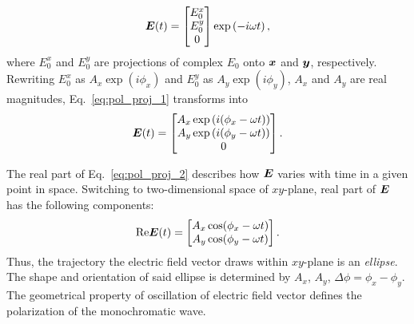 \begin{equation}
    \label{eq:pol_proj_1}
    \boldsymbol{E}(t) =  
    \begin{bmatrix}
        E_0^x \\
        E_0^y \\
        0
    \end{bmatrix} \exp\left(-i\omega t\right),
\end{equation}
where $E_0^x$ and $E_0^y$ are projections of complex $E_0$ onto $\boldsymbol{x}$ and $\boldsymbol{y}$, respectively.
Rewriting $E_0^x$ as $A_x\exp\left(i\phi_x\right)$ and $E_0^y$ as $A_y\exp\left(i\phi_y\right)$, $A_x$ and $A_y$ are real magnitudes, Eq.~\ref{eq:pol_proj_1} transforms into
\begin{equation}
    \label{eq:pol_proj_2}
    \boldsymbol{E}(t) = 
    \begin{bmatrix}
        A_x\exp\left(i(\phi_x - \omega t)\right)    \\
        A_y\exp\left(i(\phi_y - \omega t)\right)    \\
        0
    \end{bmatrix}.
\end{equation}

The real part of Eq.~\ref{eq:pol_proj_2} describes how $\boldsymbol{E}$ varies with time in a given point in space.
Switching to two-dimensional space of $xy$-plane, real part of $\boldsymbol{E}$ has the following components:
\begin{equation}
    \label{eq:pol_proj_3}
    \mathrm{Re} \boldsymbol{E}(t) = 
    \begin{bmatrix}
    A_x \cos(\phi_x - \omega t) \\
    A_y \cos(\phi_y - \omega t) 
    \end{bmatrix}.
\end{equation}
Thus, the trajectory the electric field vector draws within $xy$-plane is an \textit{ellipse}.
The shape and orientation of said ellipse is determined by $A_x$, $A_y$, $\Delta\phi = \phi_x - \phi_y$.
The geometrical property of oscillation of electric field vector defines the polarization of the monochromatic wave.


